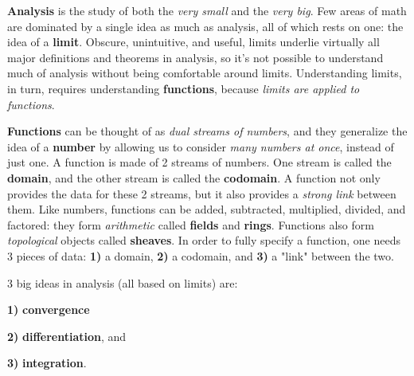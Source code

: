\def \mathbb { \bf }

\def \N {{ \mathbb N }}
\def \Z {{ \mathbb Z }}
\def \Q {{ \mathbb Q }}
\def \R {{ \mathbb R }}
\def \C {{ \mathbb C }}
\def \H {{ \mathbb H }}


\def \to      { \longrightarrow }
\def \mapsto  { \longmapsto }

\def \then    { ~ \Longrightarrow ~ }
\def \iff     { ~ \Longleftrightarrow ~ }
\def \and     { ~ \wedge ~ }
\def \or      { ~ \vee ~ }

\def \d {{~\rm d}}  %

\def \IFF     {{\hskip4pt \sc iff \hskip2pt}}

\vskip8pt
{\bf Analysis} is the study of both the {\it very small} and the {\it very big}. Few areas of math are dominated by a single idea as much as analysis, all of which rests on one: the idea of a {\bf limit}. Obscure, unintuitive, and useful, limits underlie virtually all major definitions and theorems in analysis, so it's not possible to understand much of analysis without being comfortable around limits. Understanding limits, in turn, requires understanding {\bf functions}, because {\it limits are applied to functions}.

{\bf Functions} can be thought of as {\it dual streams of numbers}, and they generalize the idea of a {\bf number} by allowing us to consider {\it many numbers at once}, instead of just one. A function is made of 2 streams of numbers. One stream is called the {\bf domain}, and the other stream is called the {\bf codomain}. A function not only provides the data for these 2 streams, but it also provides a {\it strong link} between them. Like numbers, functions can be added, subtracted, multiplied, divided, and factored: they form {\it arithmetic} called {\bf fields} and {\bf rings}. Functions also form {\it topological} objects called {\bf sheaves}. In order to fully specify a function, one needs 3 pieces of data: {\bf 1)} a domain, {\bf 2)} a codomain, and {\bf 3)} a "link" between the two.

3 big ideas in analysis (all based on limits) are:

{\bf 1)} {\bf convergence} \par
{\bf 2)} {\bf differentiation}, and \par
{\bf 3)} {\bf integration}.

